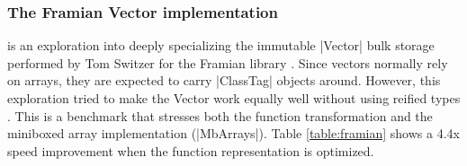 \subsubsection{The Framian Vector implementation} is an exploration into deeply specializing the immutable |Vector| bulk storage performed by Tom Switzer for the Framian library \cite{framian}. Since vectors normally rely on arrays, they are expected to carry |ClassTag| objects around. However, this exploration tried to make the Vector work equally well without using reified types \cite{tixxit-respecialization15,tixxit-respecialization6}. This is a benchmark that stresses both the function transformation and the miniboxed array implementation (|MbArrays|). Table \ref{table:framian} shows a 4.4x speed improvement when the function representation is optimized.
